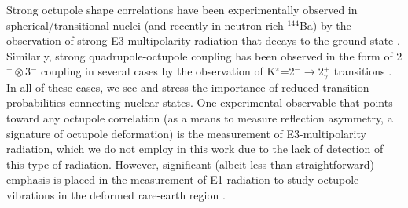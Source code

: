 Strong octupole shape correlations have been experimentally observed in spherical/transitional nuclei (and recently in neutron-rich $^{144}$Ba) by the observation of strong E3 multipolarity radiation that decays to the ground state \cite{Bucher_Octupole144Ba_2016,Garrett_2009_negShapeCoex}. Similarly, strong quadrupole-octupole coupling has been observed in the form of 2$^+\otimes$3$^-$ coupling in several cases by the observation of K$^\pi$=2$^-\rightarrow$2$^+_\gamma$ transitions \cite{Pascu_octupole_2015,Spiecker_E1strength,Soloviev_QuadHex}. In all of these cases, we see and stress the importance of reduced transition probabilities connecting nuclear states. One experimental observable that points toward any octupole correlation (as a means to measure reflection asymmetry, a signature of octupole deformation) is the measurement of E3-multipolarity radiation, which we do not employ in this work due to the lack of detection of this type of radiation. However, significant (albeit less than straightforward) emphasis is placed in the measurement of E1 radiation to study octupole vibrations in the deformed rare-earth region \cite{Pascu_octupole_2015,Soloviev_QuadHex}. 


